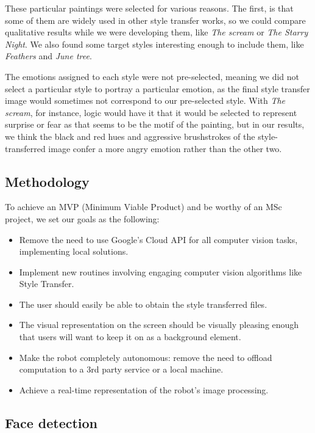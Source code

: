 These particular paintings were selected for various reasons. The first, is that some of them are widely used in other style transfer works, so we could compare qualitative results while we were developing them, like \emph{The scream} or \emph{The Starry Night}. We also found some target styles interesting enough to include them, like \emph{Feathers} and \emph{June tree}. 

The emotions assigned to each style were not pre-selected, meaning we did not select a particular style to portray a particular emotion, as the final style transfer image would sometimes not correspond to our pre-selected style. With \emph{The scream}, for instance, logic would have it that it would be selected to represent surprise or fear as that seems to be the motif of the painting, but in our results, we think the black and red hues and aggressive brushstrokes of the style-transferred image confer a more angry emotion rather than the other two.



\subsection{Methodology}
To achieve an MVP (Minimum Viable Product) and be worthy of an MSc project, we set our goals as the following:

\begin{itemize}
  \item Remove the need to use Google's Cloud API for all computer vision tasks, implementing local solutions.
  \item Implement new routines involving engaging computer vision algorithms like Style Transfer.
  \item The user should easily be able to obtain the style transferred files.
  \item The visual representation on the screen should be visually pleasing enough that users will want to keep it on as a background element.
  \item Make the robot completely autonomous: remove the need to offload computation to a 3rd party service or a local machine.
  \item Achieve a real-time representation of the robot's image processing.
\end{itemize}


\subsection{Face detection}

